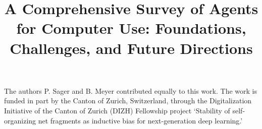 \documentclass[]{preprint}
\begin{document}
\title[Agents for Computer Use]{A Comprehensive Survey of Agents for Computer Use: Foundations, Challenges, and Future Directions}








\maketitle












\begin{acks}
The authors P. Sager and B. Meyer contributed equally to this work.
The work is funded in part by the Canton of Zurich, Switzerland, through the Digitalization Initiative of the Canton of Zurich (DIZH) Fellowship project `Stability of self-organizing net fragments as inductive bias for next-generation deep learning.'
\end{acks}

\end{document}
